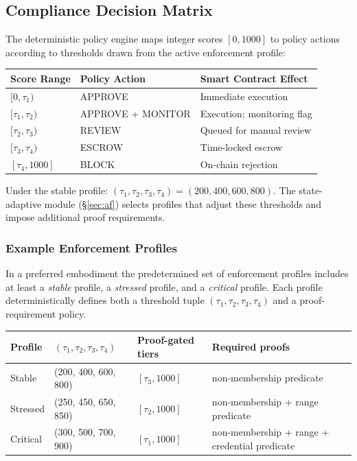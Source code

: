 \documentclass[12pt,a4paper]{article}
\begin{document}
\subsection{Compliance Decision Matrix}
\label{sec:matrix}

The deterministic policy engine maps integer scores $[0,1000]$ to policy
actions according to thresholds drawn from the active enforcement profile:

\begin{center}
\begin{tabular}{lll}
\toprule
\textbf{Score Range} & \textbf{Policy Action} & \textbf{Smart Contract Effect}\\
\midrule
$[0,\tau_1)$ & APPROVE & Immediate execution \\
$[\tau_1,\tau_2)$ & APPROVE + MONITOR & Execution; monitoring flag \\
$[\tau_2,\tau_3)$ & REVIEW & Queued for manual review \\
$[\tau_3,\tau_4)$ & ESCROW & Time-locked escrow \\
$[\tau_4,1000]$ & BLOCK & On-chain rejection \\
\bottomrule
\end{tabular}
\end{center}

Under the stable profile: $(\tau_1,\tau_2,\tau_3,\tau_4) =
(200,400,600,800)$. The state-adaptive module (\S\ref{sec:af}) selects
profiles that adjust these thresholds and impose additional proof
requirements.

\subsubsection{Example Enforcement Profiles}

In a preferred embodiment the predetermined set of enforcement profiles
includes at least a \textit{stable} profile, a \textit{stressed} profile, and
a \textit{critical} profile. Each profile deterministically defines both a
threshold tuple $(\tau_1,\tau_2,\tau_3,\tau_4)$ and a proof-requirement
policy.

\begin{center}
\begin{tabular}{llll}
\toprule
\textbf{Profile} & $(\tau_1,\tau_2,\tau_3,\tau_4)$ & \textbf{Proof-gated tiers} & \textbf{Required proofs}\\
\midrule
Stable & (200, 400, 600, 800) & $[\tau_3,1000]$ & non-membership predicate \\
Stressed & (250, 450, 650, 850) & $[\tau_2,1000]$ & non-membership + range predicate \\
Critical & (300, 500, 700, 900) & $[\tau_1,1000]$ & non-membership + range + credential predicate \\
\bottomrule
\end{tabular}
\end{center}
\end{document}

